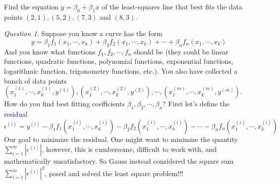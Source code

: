 \documentclass{beamer}
\theoremstyle{definition}
\theoremstyle{remark}
\newtheorem*{question}{Question}
\begin{document}
\begin{frame}[t]
\begin{example}
Find the equation $y=\beta_0+\beta_1x$ of the least-squares line that best fits the data points $(2,1),(5,2),(7,3)$ and $(8,3)$.
\end{example}
\end{frame}

\begin{frame}[t]
\begin{question}
Suppose you know a curve has the form
\[
y=\beta_1f_1(x_1,\cdots,x_k)+\beta_2f_2(x_1,\cdots,x_k)+\cdots+\beta_nf_n(x_1,\cdots,x_k)
\]
And you know what functions $f_1,f_2,\cdots,f_n$ should be (they could be linear functions, quadratic functions, polynomial functions, exponential functions, logarithmic function, trigonometry functions, etc.)\pause. You also have collected a bunch of data points $(x_1^{(1)},\cdots,x_k^{(1)},y^{(1)}),(x_1^{(2)},\cdots,x_k^{(2)},y^{(2)}),\cdots,(x_1^{(m)},\cdots,x_k^{(m)},y^{(m)})$\pause. How do you find best fitting coefficients $\beta_1,\beta_2,\cdots,\beta_n$\pause? First let's define the \textcolor{blue}{residual}
\[
\epsilon^{(i)}=y^{(i)}-\beta_1f_1(x_1^{(i)},\cdots,x_k^{(i)})-\beta_2f_2(x_1^{(i)},\cdots,x_k^{(i)})-\cdots-\beta_nf_n(x_1^{(i)},\cdots,x_k^{(i)})
\]\pause
Our goal to minimize the residual\pause. One might want to minimize the quantity $\sum_{i=1}^m|\epsilon^{(i)}|$, however, this is cumbersome, difficult to work with, and mathematically unsatisfactory\pause. So Gauss instead considered the square sum $\sum_{i=1}^m|\epsilon^{(i)}|^2$, posed and solved the least square problem!!!
\end{question}
\end{frame}
\end{document}

